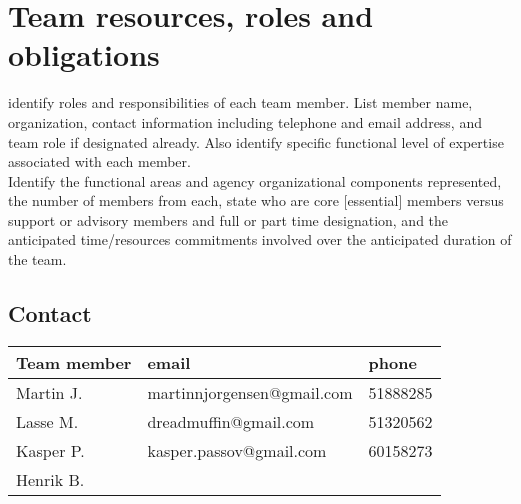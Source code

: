 \section{Team resources, roles and obligations} identify roles and
responsibilities of each team member. List member name, organization,
contact information including telephone and email address, and team role
if designated already. Also identify specific functional level of expertise
associated with each member.\\ Identify the functional areas and agency
organizational components represented, the number of members from each, state
who are core [essential] members versus support or advisory members and full or
part time designation, and the anticipated time/resources commitments involved
over the anticipated duration of the team.

\subsection{Contact}
\begin{table}
    \centering
    \begin{tabular}{l|l|l}
        \rowcolor{Gray}
        \textbf{Team member} & \textbf{email} & \textbf{phone} \\\hline
        Martin J.            & martinnjorgensen@gmail.com & 51888285\\
        Lasse M.             & dreadmuffin@gmail.com & 51320562\\
        Kasper P.            & kasper.passov@gmail.com & 60158273\\
        Henrik B.            & & 
    \end{tabular}
    \label{tab:contact}
\end{table}


